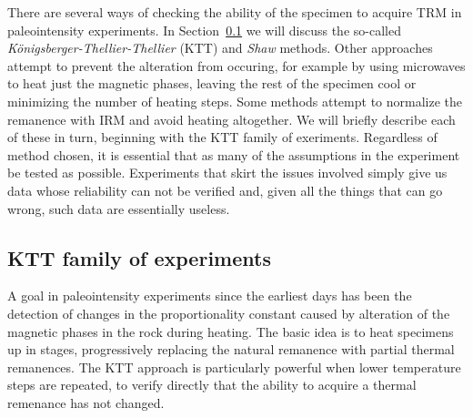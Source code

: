 


There are several ways of checking the ability of the specimen to acquire TRM in paleointensity experiments.  In Section~\ref{sect:KTT}  we will discuss the so-called 
{\it K\"onigsberger-Thellier-Thellier}  (KTT) and 
{\it Shaw} methods.   Other approaches attempt to prevent the alteration from occuring, for example by using microwaves to heat just the magnetic phases, leaving the rest of the specimen cool or minimizing the number of heating steps.  Some methods attempt to normalize the remanence with IRM and avoid heating altogether.  We will briefly describe each of these in turn, beginning with the KTT family of exeriments.   Regardless of method chosen,  it is essential that as many of the assumptions in the experiment be tested as possible.  Experiments that skirt the issues involved simply give us data whose reliability can not be verified and, given all the things that can go wrong, such data are essentially useless.   



\subsection{KTT family of  experiments}
\label{sect:KTT}

A goal in paleointensity experiments since the earliest days has been the detection of changes in the proportionality constant caused by alteration of the magnetic phases in the rock during heating. 
The basic idea is to heat specimens up in stages, progressively replacing the natural remanence with  partial thermal remanences.    The
 KTT  approach is particularly powerful when lower temperature    steps are repeated, to verify directly  that the ability to acquire a  thermal remenance has not changed.   
  
